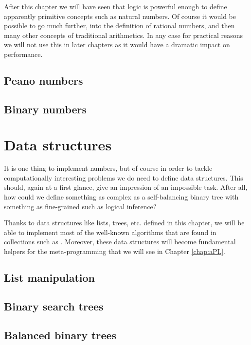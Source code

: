 \documentclass[12pt,b5paper]{book}
\theoremstyle{definition}
\begin{document}
After this chapter we will have seen that logic is powerful enough to define apparently primitive concepts such as natural numbers. Of course it would be possible to go much further, into the definition of rational numbers, and then many other concepts of traditional arithmetics. In any case for practical reasons we will not use this in later chapters as it would have a dramatic impact on performance.


\section{Peano numbers}
\label{sec:peanoNumbers}



\section{Binary numbers}
\label{sec:binaryNumbers}



\chapter{Data structures}
\label{chap:dataStructures}
It is one thing to implement numbers, but of course in order to tackle computationally interesting problems we do need to define data structures. This should, again at a first glance, give an impression of an impossible task. After all, how could we define something as complex as a self-balancing binary tree with something as fine-grained such as logical inference?

Thanks to data structures like lists, trees, etc. defined in this chapter, we will be able to implement most of the well-known algorithms that are found in collections such as \cite{CLRS}. Moreover, these data structures will become fundamental helpers for the meta-programming that we will see in Chapter \ref{chap:aPL}.


\section{List manipulation}
\label{sec:lists}



\section{Binary search trees}
\label{sec:binarySearchTrees}



\section{Balanced binary trees}
\label{sec:balancedBinaryTrees}

\end{document}
